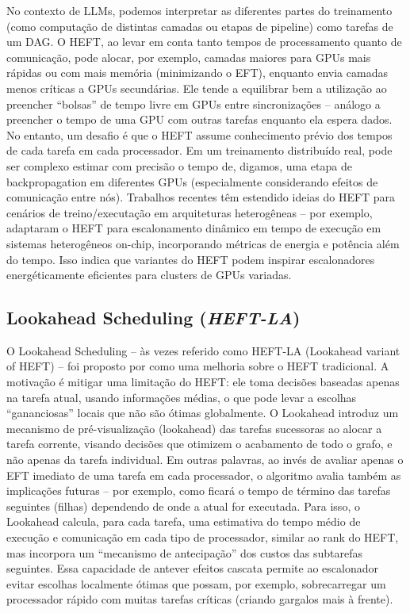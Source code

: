 \documentclass[12pt, %
openright, 
oneside, %
a4paper,    %
brazil]{facom-ufu-abntex2}
\begin{document}
No contexto de LLMs, podemos interpretar as diferentes partes do treinamento (como computação de
distintas camadas ou etapas de pipeline) como tarefas de um DAG. O HEFT, ao levar em conta tanto
tempos de processamento quanto de comunicação, pode alocar, por exemplo, camadas maiores para
GPUs mais rápidas ou com mais memória (minimizando o EFT), enquanto envia camadas menos críticas
a GPUs secundárias. Ele tende a equilibrar bem a utilização ao preencher “bolsas” de tempo livre em
GPUs entre sincronizações – análogo a preencher o tempo de uma GPU com outras tarefas enquanto
ela espera dados. No entanto, um desafio é que o HEFT assume conhecimento prévio dos tempos de
cada tarefa em cada processador. Em um treinamento distribuído real, pode ser complexo estimar com
precisão o tempo de, digamos, uma etapa de backpropagation em diferentes GPUs (especialmente
considerando efeitos de comunicação entre nós). Trabalhos recentes têm estendido ideias do HEFT para
cenários de treino/executação em arquiteturas heterogêneas – por exemplo, \cite{mack2021performant}
adaptaram o HEFT para escalonamento dinâmico em tempo de execução em sistemas heterogêneos
on-chip, incorporando métricas de energia e potência além do tempo\cite{mack2021performant}. Isso indica que variantes
do HEFT podem inspirar escalonadores energéticamente eficientes para clusters de GPUs variadas.

\subsection{Lookahead Scheduling (\textit{HEFT-LA})}
O Lookahead Scheduling – às vezes referido como HEFT-LA (Lookahead variant of HEFT) – foi proposto
por \cite{bittencourt2010dag} como uma melhoria sobre o HEFT tradicional. A motivação é mitigar uma
limitação do HEFT: ele toma decisões baseadas apenas na tarefa atual, usando informações médias, o
que pode levar a escolhas “gananciosas” locais que não são ótimas globalmente. O Lookahead introduz
um mecanismo de pré-visualização (lookahead) das tarefas sucessoras ao alocar a tarefa corrente,
visando decisões que otimizem o acabamento de todo o grafo, e não apenas da tarefa individual\cite{bittencourt2010dag}. Em outras palavras, ao invés de avaliar apenas o EFT imediato de uma tarefa em cada processador, o
algoritmo avalia também as implicações futuras – por exemplo, como ficará o tempo de término das
tarefas seguintes (filhas) dependendo de onde a atual for executada. Para isso, o Lookahead calcula,
para cada tarefa, uma estimativa do tempo médio de execução e comunicação em cada tipo de
processador, similar ao rank do HEFT, mas incorpora um “mecanismo de antecipação” dos custos das
subtarefas seguintes\cite{bittencourt2010dag}. Essa capacidade de antever efeitos cascata permite ao escalonador evitar
escolhas localmente ótimas que possam, por exemplo, sobrecarregar um processador rápido com
muitas tarefas críticas (criando gargalos mais à frente).
\end{document}
